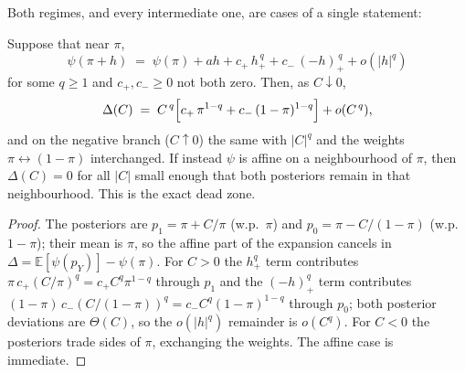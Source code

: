 \documentclass[acmsmall,screen,review,anonymous]{acmart}
\newcommand{\E}{\mathbb{E}}
\begin{document}
Both regimes, and every intermediate one, are cases of a single
statement:

\begin{theorem}\label{thm:contact}
Suppose that near $\pi$,
\[
\psi(\pi+h)\;=\;\psi(\pi)+ah+c_+\,h_+^{\,q}+c_-\,(-h)_+^{\,q}+o(|h|^q)
\]
for some $q\ge1$ and $c_+,c_-\ge0$ not both zero. Then, as $C\downarrow0$,
\[
\Delta(C)\;=\;C^{\,q}\Bigl[c_+\,\pi^{1-q}+c_-\,(1-\pi)^{1-q}\Bigr]+o(C^{\,q}),
\]
and on the negative branch ($C\uparrow0$) the same with $|C|^q$ and the
weights $\pi\leftrightarrow(1-\pi)$ interchanged. If instead $\psi$ is
affine on a neighbourhood of $\pi$, then $\Delta(C)=0$ for all $|C|$ small
enough that both posteriors remain in that neighbourhood. This is the exact dead
zone.
\end{theorem}

\begin{proof}
The posteriors are $p_1=\pi+C/\pi$ (w.p.\ $\pi$) and $p_0=\pi-C/(1-\pi)$
(w.p.\ $1-\pi$); their mean is $\pi$, so the affine part of the expansion
cancels in $\Delta=\E[\psi(p_Y)]-\psi(\pi)$. For $C>0$ the $h_+^q$ term
contributes $\pi\,c_+(C/\pi)^q=c_+C^q\pi^{1-q}$ through $p_1$ and the
$(-h)_+^q$ term contributes $(1-\pi)\,c_-(C/(1-\pi))^q=c_-C^q(1-\pi)^{1-q}$
through $p_0$; both posterior deviations are $\Theta(C)$, so the $o(|h|^q)$
remainder is $o(C^q)$. For $C<0$ the posteriors trade sides of $\pi$,
exchanging the weights. The affine case is immediate.
\end{proof}
\end{document}
